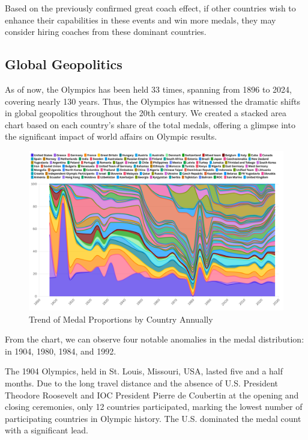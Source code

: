 \documentclass[12pt]{article}  %
\begin{document}
Based on the previously confirmed great coach effect, if other countries wish to enhance their capabilities in these events and win more medals, they may consider hiring coaches from these dominant countries.



\subsection{Global Geopolitics}
As of now, the Olympics has been held 33 times, spanning from 1896 to 2024, covering nearly 130 years. Thus, the Olympics has witnessed the dramatic shifts in global geopolitics throughout the 20th century. We created a stacked area chart based on each country's share of the total medals, offering a glimpse into the significant impact of world affairs on Olympic results.

\begin{figure}[htbp]
	\centering
	\includegraphics[width=16cm]{img/3.3-1.png}
	\caption{Trend of Medal Proportions by Country Annually}
	\label{fig:aa}
\end{figure}

From the chart, we can observe four notable anomalies in the medal distribution: in 1904, 1980, 1984, and 1992.

The 1904 Olympics, held in St. Louis, Missouri, USA, lasted five and a half months. Due to the long travel distance and the absence of U.S. President Theodore Roosevelt and IOC President Pierre de Coubertin at the opening and closing ceremonies, only 12 countries participated, marking the lowest number of participating countries in Olympic history. The U.S. dominated the medal count with a significant lead.
\end{document}
